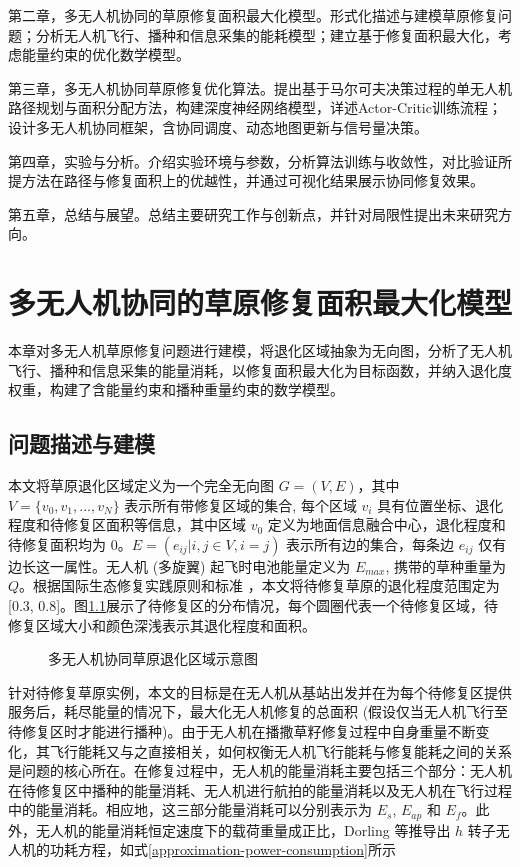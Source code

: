 \documentclass[AutoFakeBold]{LZUThesis}
\begin{document}
第二章，多无人机协同的草原修复面积最大化模型。形式化描述与建模草原修复问题；分析无人机飞行、播种和信息采集的能耗模型；建立基于修复面积最大化，考虑能量约束的优化数学模型。

第三章，多无人机协同草原修复优化算法。提出基于马尔可夫决策过程的单无人机路径规划与面积分配方法，构建深度神经网络模型，详述Actor-Critic训练流程；设计多无人机协同框架，含协同调度、动态地图更新与信号量决策。

第四章，实验与分析。介绍实验环境与参数，分析算法训练与收敛性，对比验证所提方法在路径与修复面积上的优越性，并通过可视化结果展示协同修复效果。

第五章，总结与展望。总结主要研究工作与创新点，并针对局限性提出未来研究方向。

\chapter{多无人机协同的草原修复面积最大化模型}

本章对多无人机草原修复问题进行建模，将退化区域抽象为无向图，分析了无人机飞行、播种和信息采集的能量消耗，以修复面积最大化为目标函数，并纳入退化度权重，构建了含能量约束和播种重量约束的数学模型。
\section{问题描述与建模}

本文将草原退化区域定义为一个完全无向图 $G = (V, E)$，其中 $V = \{v_0, v_1, ..., v_N \}$ 表示所有带修复区域的集合, 每个区域 $v_i$ 具有位置坐标、退化程度和待修复区面积等信息，其中区域 $v_0$ 定义为地面信息融合中心，退化程度和待修复面积均为 0。$E = (e_{ij} |i, j \in V, i = j)$ 表示所有边的集合，每条边 $e_{ij}$ 仅有边长这一属性。无人机 (多旋翼) 起飞时电池能量定义为 $E_{max}$, 携带的草种重量为 $Q$。根据国际生态修复实践原则和标准\cite{gann2019international} ，本文将待修复草原的退化程度范围定为 [0.3, 0.8]。图\ref{fig:restored-areas}展示了待修复区的分布情况，每个圆圈代表一个待修复区域，待修复区域大小和颜色深浅表示其退化程度和面积。

\begin{figure}[htbp]
	\centering
	
	\caption{多无人机协同草原退化区域示意图}
	\label{fig:restored-areas}
\end{figure}

针对待修复草原实例，本文的目标是在无人机从基站出发并在为每个待修复区提供服务后，耗尽能量的情况下，最大化无人机修复的总面积 (假设仅当无人机飞行至待修复区时才能进行播种)。由于无人机在播撒草籽修复过程中自身重量不断变化，其飞行能耗又与之直接相关，如何权衡无人机飞行能耗与修复能耗之间的关系是问题的核心所在。在修复过程中，无人机的能量消耗主要包括三个部分：无人机在待修复区中播种的能量消耗、无人机进行航拍的能量消耗以及无人机在飞行过程中的能量消耗。相应地，这三部分能量消耗可以分别表示为 $E_s$, $E_{ap}$ 和 $E_f$。此外，无人机的能量消耗恒定速度下的载荷重量成正比，Dorling\cite{dorling2016vehicle} 等推导出 $h$ 转子无人机的功耗方程，如式\eqref{approximation-power-consumption}所示
\end{document}
